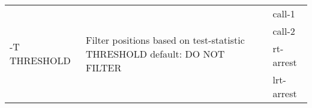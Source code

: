 {\small
\begin{tabular}{@{}p{}p{}l@{}}
\multirow{4}{=}{-T THRESHOLD} & \multirow{4}{=}{Filter positions based on test-statistic THRESHOLD
 default: DO NOT FILTER} & call-1 \\
 &  & call-2 \\
 &  & rt-arrest \\
 &  & lrt-arrest \\
\end{tabular}\\
}
